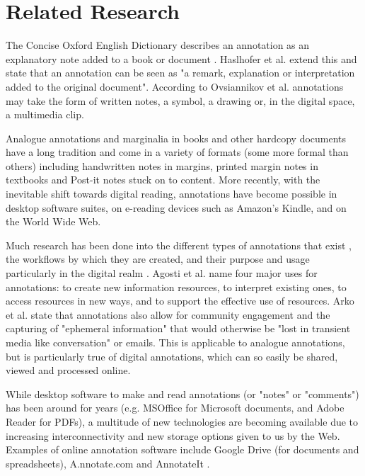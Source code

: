 
\chapter{Related Research} %

\label{Chapter3} %


The Concise Oxford English Dictionary describes an annotation as an explanatory note added to a book or document \citep{OxfordDict}. Haslhofer et al. \citep[p. 17]{LEMO} extend this and state that an annotation can be seen as "a remark, explanation or interpretation added to the original document". According to Ovsiannikov et al. \citep{Ovsiannikov} annotations may take the form of written notes, a symbol, a drawing or, in the digital space, a multimedia clip. 

Analogue annotations and marginalia in books and other hardcopy documents have a long tradition \citep{LEMO} and come in a variety of formats (some more formal than others) including handwritten notes in margins, printed margin notes in textbooks and Post-it notes stuck on to content. More recently, with the inevitable shift towards digital reading, annotations have become possible in desktop software suites, on e-reading devices such as Amazon's Kindle, and on the World Wide Web. 

Much research has been done into the different types of annotations that exist \citep{Marshall2000} \citep{Marshall2004}, the workflows by which they are created, and their purpose and usage  particularly in the digital realm \citep{Agosti} \citep{Ovsiannikov}. Agosti et al. \citep{Agosti} name four major uses for annotations: to create new information resources, to interpret existing ones, to access resources in new ways, and to support the effective use of resources.  Arko et al. \citep{Arko} state that annotations also allow for community engagement and the capturing of "ephemeral information" that would otherwise be "lost in transient media like conversation" or emails. This is applicable to analogue annotations, but is particularly true of digital annotations, which can so easily be shared, viewed and processed online.


While desktop software to make and read annotations (or "notes" or "comments") has been around for years (e.g. MSOffice \citep{MSOffice} for Microsoft documents, and Adobe Reader \citep{Adobe} for PDFs), a multitude of new technologies are becoming available due to increasing interconnectivity and new storage options given to us by the Web. Examples of online annotation software include Google Drive \citep{GDrive} (for documents and spreadsheets), A.nnotate.com \citep{AnnotateCom} and AnnotateIt \citep{AnnotateIt}.


